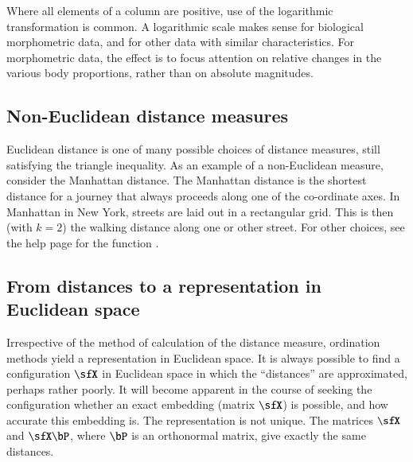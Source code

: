 Where all elements of a column are positive, use of the
logarithmic transformation is common. A logarithmic scale makes sense
for biological morphometric data, and for other data with similar
characteristics.  For morphometric data, the effect is to focus
attention on relative changes in the various body proportions,
rather than on absolute magnitudes.

\subsection*{Non-Euclidean distance measures}

Euclidean distance is one of many possible choices of distance
measures, still satisfying the triangle inequality.  As an example of
a non-Euclidean measure, consider the Manhattan distance.
The Manhattan distance is the shortest distance for a journey that
always proceeds along one of the co-ordinate axes.  In Manhattan in
New York, streets are laid out in a rectangular grid.  This is then
(with $k=2$) the walking distance along one or other street.  For
other choices, see the help page for the function
.

\subsection*{From distances to a representation in Euclidean space}

Irrespective of the method of calculation of the distance measure,
ordination methods yield a representation in Euclidean space.  It is
always possible to find a configuration $\sfX$ in Euclidean space in
which the ``distances'' are approximated, perhaps rather
poorly.  It will become apparent in the course of seeking the
configuration whether an exact embedding (matrix $\sfX$) is possible,
and how accurate this embedding is.
The representation is not
unique.  The matrices $\sfX$ and $\sfX \bP$, where $\bP$ is an
orthonormal matrix, give exactly the same distances.


